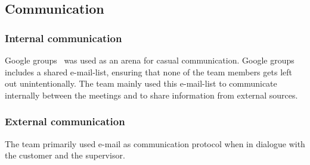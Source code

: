 \subsection{Communication}
\subsubsection{Internal communication}
Google groups~\cite{ggroups} was used as an arena for casual communication. Google groups includes a shared e-mail-list, ensuring that none of the team members gets left out unintentionally. The team mainly used this e-mail-list to communicate internally between the meetings and to share information from external sources. 

\subsubsection{External communication}
The team primarily used e-mail as communication protocol when in dialogue with the customer and the supervisor.